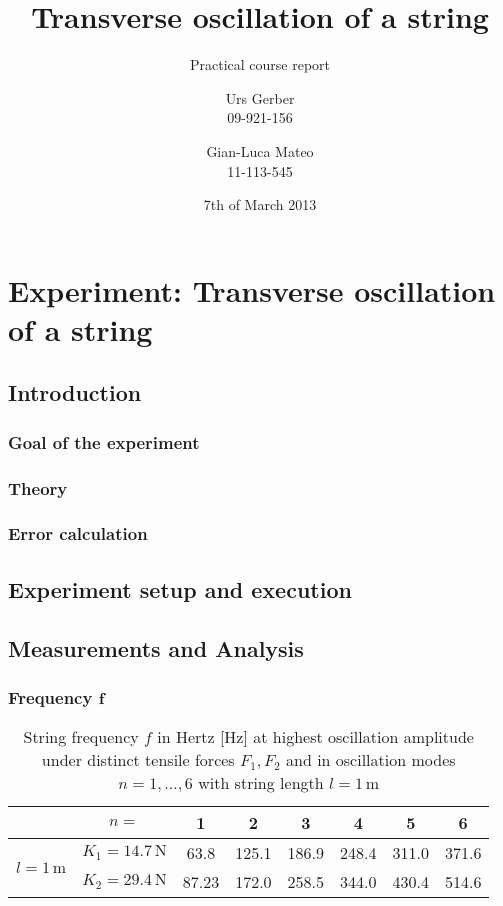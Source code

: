 \documentclass[abstract=on]{scrreprt}
\author{Urs Gerber\\09-921-156 \and Gian-Luca Mateo\\11-113-545}
\date{7th of March 2013}
\title{Transverse oscillation of a string}
\subtitle{Practical course report}
\newcommand{\unit}[1]{\ensuremath{\, \mathrm{#1}}}
\begin{document}
\maketitle

\tableofcontents
\newpage

\chapter{Experiment: Transverse oscillation of a string}
\section{Introduction}

\subsection{Goal of the experiment}
\subsection{Theory}
\subsection{Error calculation}

\section{Experiment setup and execution}

\section{Measurements and Analysis}

\subsection[Frequency]{Frequency $\bm{f}$}

\begin{table}[H]
	\center
	\begin{tabular}{|c|c|cccccc|}
	\cline{2-8}
	 \multicolumn{1}{c|}{}& $n=$ & 1 & 2 & 3 & 4 & 5 & 6\\  \hline
	\multirow{2}{*}{$l=1\unit{m}$} & $K_1=14.7\unit{N}$ & 63.8 & 125.1 & 186.9 & 248.4 & 311.0 & 371.6\\
	& $K_2=29.4\unit{N}$ & 87.23 & 172.0 & 258.5 & 344.0 & 430.4 & 514.6\\
	\hline
	\end{tabular}
	\caption{String frequency $f$ in Hertz [Hz] at highest oscillation amplitude under distinct tensile forces $F_1, F_2$ and in oscillation modes $n=1,...,6$ with string length $l=1\unit{m}$}
\end{table}
\end{document}
